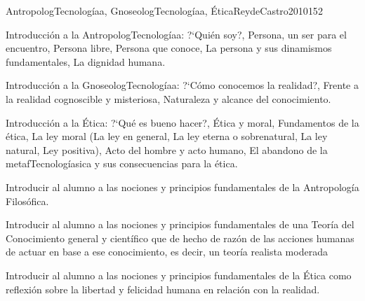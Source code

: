 \begin{syllabus}
\begin{unit}{AntropologTecnologíaa, GnoseologTecnologíaa, Ética}{ReydeCastro2010}{15}{2}
\begin{topics}
	\item Introducción a la AntropologTecnologíaa: ?`Quién soy?, Persona, un ser para el encuentro, Persona libre, Persona que conoce, La persona y sus dinamismos fundamentales, La dignidad humana.
	\item Introducción a la GnoseologTecnologíaa: ?`Cómo conocemos la realidad?, Frente a la realidad cognoscible y misteriosa, Naturaleza y alcance del conocimiento.
	\item Introducción a la Ética: ?`Qué es bueno hacer?, Ética y moral, Fundamentos de la ética, La ley moral (La ley en general, La ley eterna o sobrenatural, La ley natural, Ley positiva), Acto del hombre y acto humano, El abandono de la metafTecnologíasica y sus consecuencias para la ética.
\end{topics}

\begin{unitgoals}
	\item Introducir al alumno a las nociones y principios fundamentales de la Antropología Filosófica.
	\item Introducir al alumno a las nociones y principios fundamentales de una Teoría del Conocimiento general y científico que de hecho de razón de las acciones humanas de actuar en base a ese conocimiento, es decir, un teoría realista moderada
	\item Introducir al alumno a las nociones y principios fundamentales de la Ética como reflexión sobre la libertad y felicidad humana en relación con la realidad.
\end{unitgoals}
\end{unit}


\end{syllabus}

